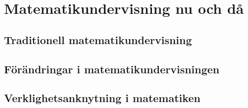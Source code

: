 \documentclass[11 pt,a4paper]{article}
\begin{document}

% 


\newpage

\renewcommand\abstractname{Sammandrag}\begin{abstract}

\end{abstract}

\newpage

\renewcommand\abstractname{Abstract}
\begin{abstract} 

\end{abstract}

\newpage
 
\tableofcontents

\newpage
{}

%    

%     
    
    \section{Matematikundervisning nu och då}
        
        
    \subsection{Traditionell matematikundervisning}
        
    
    \subsection{Förändringar i matematikundervisningen}
        
        \label{sec:Forandringar}
        
    \subsection{Verklighetsanknytning i matematiken}
        
        
\end{document}
